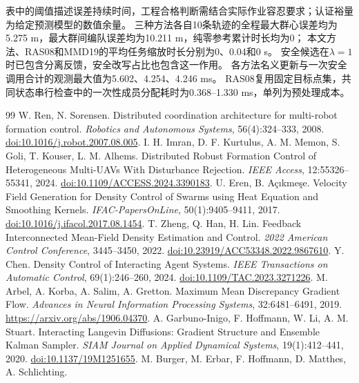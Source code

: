 \documentclass[UTF8,a4paper,11pt,fontset=none]{ctexart}
\begin{document}
表中的阈值描述误差持续时间，工程合格判断需结合实际作业容忍要求；认证裕量为给定预测模型的数值余量。
三种方法各自10条轨迹的全程最大群心误差均为5.275 m，最大群间编队误差均为10.211 m，纯零参考累计时长均为0；
本文方法、RAS08和MMD19的平均任务缩放时长分别为0、0.04和0 s。
安全候选在$\lambda=1$时已包含分离反馈，安全改写占比也包含这一作用。
各方法名义更新与一次安全调用合计的观测最大值为5.602、4.254、4.246 ms。
RAS08复用固定目标点集，共同状态串行检查中的一次性成员分配耗时为0.368--1.330 ms，单列为预处理成本。

\begin{thebibliography}{99}\footnotesize
\setlength{\itemsep}{2pt}\setlength{\parskip}{0pt}
 W. Ren, N. Sorensen. Distributed coordination architecture for multi-robot formation control.
\emph{Robotics and Autonomous Systems}, 56(4):324--333, 2008.
\href{https://doi.org/10.1016/j.robot.2007.08.005}{doi:10.1016/j.robot.2007.08.005}.
 I. H. Imran, D. F. Kurtulus, A. M. Memon, S. Goli, T. Kouser, L. M. Alhems.
Distributed Robust Formation Control of Heterogeneous Multi-UAVs With Disturbance Rejection.
\emph{IEEE Access}, 12:55326--55341, 2024.
\href{https://doi.org/10.1109/ACCESS.2024.3390183}{doi:10.1109/ACCESS.2024.3390183}.
 U. Eren, B. Açıkmeşe.
Velocity Field Generation for Density Control of Swarms using Heat Equation and Smoothing Kernels.
\emph{IFAC-PapersOnLine}, 50(1):9405--9411, 2017.
\href{https://doi.org/10.1016/j.ifacol.2017.08.1454}{doi:10.1016/j.ifacol.2017.08.1454}.
 T. Zheng, Q. Han, H. Lin.
Feedback Interconnected Mean-Field Density Estimation and Control.
\emph{2022 American Control Conference}, 3445--3450, 2022.
\href{https://doi.org/10.23919/ACC53348.2022.9867610}{doi:10.23919/ACC53348.2022.9867610}.
 Y. Chen. Density Control of Interacting Agent Systems.
\emph{IEEE Transactions on Automatic Control}, 69(1):246--260, 2024.
\href{https://doi.org/10.1109/TAC.2023.3271226}{doi:10.1109/TAC.2023.3271226}.
 M. Arbel, A. Korba, A. Salim, A. Gretton.
Maximum Mean Discrepancy Gradient Flow.
\emph{Advances in Neural Information Processing Systems}, 32:6481--6491, 2019.
\url{https://arxiv.org/abs/1906.04370}.
 A. Garbuno-Inigo, F. Hoffmann, W. Li, A. M. Stuart.
Interacting Langevin Diffusions: Gradient Structure and Ensemble Kalman Sampler.
\emph{SIAM Journal on Applied Dynamical Systems}, 19(1):412--441, 2020.
\href{https://doi.org/10.1137/19M1251655}{doi:10.1137/19M1251655}.
 M. Burger, M. Erbar, F. Hoffmann, D. Matthes, A. Schlichting.

\end{thebibliography}
\end{document}
